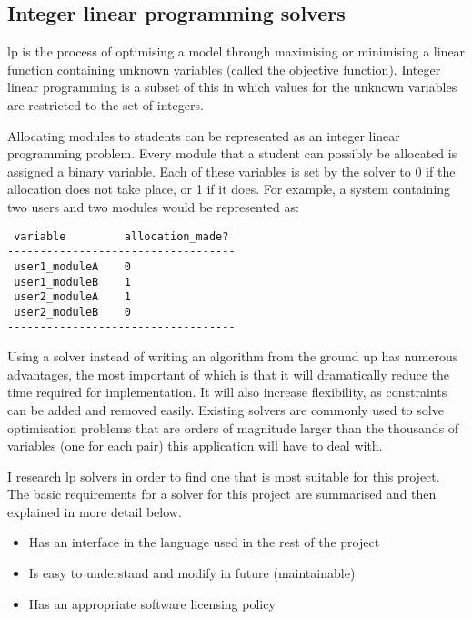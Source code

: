 
\subsection{Integer linear programming solvers}
\label{sec:researchilp}

\Gls{lp} is the process of optimising a model through maximising or minimising
a linear function containing unknown variables (called the objective
function). Integer linear programming is a subset of this in which values for
the unknown variables are restricted to the set of integers.


Allocating modules to students can be represented as an integer linear
programming problem. Every module that a student can possibly be allocated is
assigned a binary variable. Each of these variables is set by the solver to 0
if the allocation does not take place, or 1 if it does. For example, a system
containing two users and two modules would be represented as:

\begin{verbatim}
 variable         allocation_made?
-----------------------------------
 user1_moduleA    0
 user1_moduleB    1
 user2_moduleA    1
 user2_moduleB    0
-----------------------------------
\end{verbatim}

Using a solver instead of writing an algorithm from the ground up has numerous
advantages, the most important of which is that it will dramatically reduce
the time required for implementation. It will also increase flexibility, as
constraints can be added and removed easily. Existing solvers are commonly
used to solve optimisation problems that are orders of magnitude larger than
the thousands of variables (one for each \studmod pair) this application will
have to deal with.

I research \gls{lp} solvers in order to find one that is most suitable for
this project. The basic requirements for a solver for this project are
summarised and then explained in more detail below.

\begin{itemize}
  \item Has an interface in the language used in the rest of the project
  \item Is easy to understand and modify in future (maintainable)
  \item Has an appropriate software licensing policy
\end{itemize}

